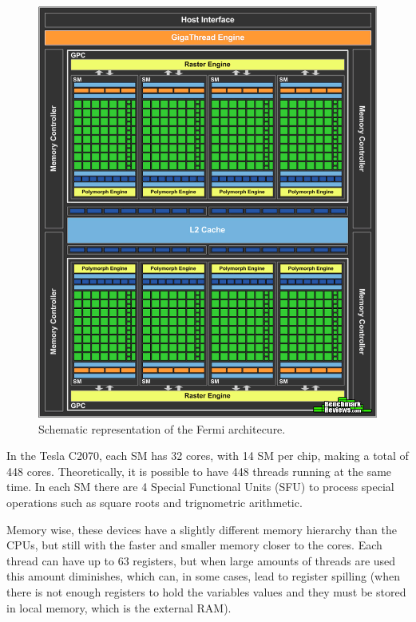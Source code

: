\begin{figure}[!htp]
	\begin{center}
		\includegraphics[scale=0.25]{../../common/img/fermi_arch.png}
		\caption{Schematic representation of the \nvidia Fermi architecure.}
		\label{fig:fermi}
	\end{center}
\end{figure}

In the Tesla C2070, each SM has 32 \cuda cores, with 14 SM per chip, making a total of 448 \cuda cores. Theoretically, it is possible to have 448 \cuda threads running at the same time. In each SM there are 4 Special Functional Units (SFU) to process special operations such as square roots and trignometric arithmetic.

Memory wise, these devices have a slightly different memory hierarchy than the CPUs, but still with the faster and smaller memory closer to the \cuda cores. Each \cuda thread can have up to 63 registers, but when large amounts of threads are used this amount diminishes, which can, in some cases, lead to register spilling (when there is not enough registers to hold the variables values and they must be stored in local memory, which is the external RAM).

